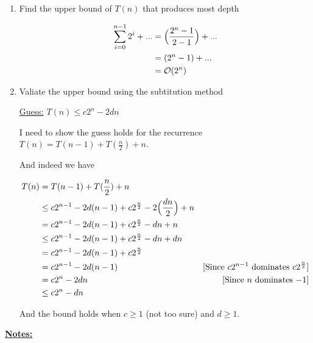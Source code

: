 \documentclass[12pt]{article}
\begin{document}
\begin{enumerate}[1.]
\begin{enumerate}[1.]
        \item Find the upper bound of $T(n)$ that produces most depth

        \bigskip

        \begin{align}
            \sum\limits_{i=0}^{n-1} 2^i + ... &= \Bigl( \frac{2^n - 1}{2 - 1} \Bigr) + ...\\
            &= (2^n - 1) + ...\\
            &= \mathcal{O}(2^n)
        \end{align}

        \bigskip

        \item Valiate the upper bound using the subtitution method

        \bigskip

        \underline{Guess:} $T(n) \leq c2^{n} - 2dn$

        \bigskip

        I need to show the guess holds for the recurrence $T(n) = T(n-1) + T(\frac{n}{2}) + n$.

        \bigskip

        And indeed we have

        \begin{align}
            T(n) &= T(n-1) + T(\frac{n}{2}) + n\\
            &\leq c2^{n-1} - 2d(n-1) + c2^{\frac{n}{2}} - 2\Bigl(\frac{dn}{2} \Bigr) + n\\
            &= c2^{n-1} - 2d(n-1) + c2^{\frac{n}{2}} - dn + n\\
            &\leq c2^{n-1} - 2d(n-1) + c2^{\frac{n}{2}} - dn + dn\\
            &= c2^{n-1} - 2d(n-1) + c2^{\frac{n}{2}}\\
            &= c2^{n-1} - 2d(n-1) & [\text{Since $c2^{n-1}$ dominates $c2^{\frac{n}{2}}$}]\\
            &= c2^{n} - 2dn & [\text{Since $n$ dominates $-1$}]\\
            &\leq c2^{n} - dn
        \end{align}

        \bigskip

        And the bound holds when $c \geq 1$ (not too sure) and $d \geq 1$.

    \end{enumerate}


    \bigskip

    \underline{\textbf{Notes:}}


\end{enumerate}
\end{document}
